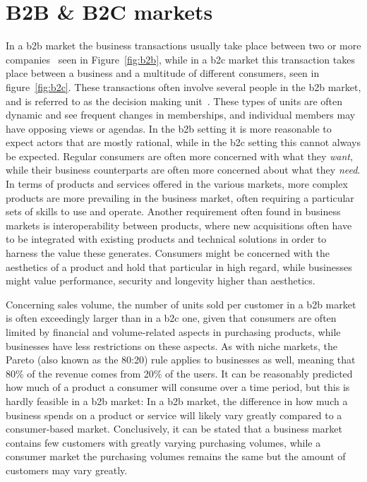 \section{B2B \& B2C markets}
In a \gls{b2b} market the business transactions usually take place between two or more companies~\cite{jewels2001towards} seen in Figure~\ref{fig:b2b}, while in a \gls{b2c} market this transaction takes place between a business and a multitude of different consumers, seen in figure~\ref{fig:b2c}. These transactions often involve several people in the \gls{b2b} market, and is referred to as the decision making unit~\cite{paulhaguenickhaguematthewharrison}. These types of units are often dynamic and see frequent changes in memberships, and individual members may have opposing views or agendas. In the \gls{b2b} setting it is more reasonable to expect actors that are mostly rational, while in the \gls{b2c} setting this cannot always be expected. Regular consumers are often more concerned with what they \textit{want}, while their business counterparts are often more concerned about what they \textit{need}. In terms of products and services offered in the various markets, more complex products are more prevailing in the business market, often requiring a particular sets of skills to use and operate. Another requirement often found in business markets is interoperability between products, where new acquisitions often have to be integrated with existing products and technical solutions in order to harness the value these generates. Consumers might be concerned with the aesthetics of a product and hold that particular in high regard, while businesses might value performance, security and longevity higher than aesthetics. 


Concerning sales volume, the number of units sold per customer in a \gls{b2b} market is often exceedingly larger than in a \gls{b2c} one, given that consumers are often limited by financial and volume-related aspects in purchasing products, while businesses have less restrictions on these aspects. As with niche markets, the Pareto (also known as the 80:20) rule applies to businesses as well, meaning that 80\% of the revenue comes from 20\% of the users. It can be reasonably predicted how much of a product a consumer will consume over a time period, but this is hardly feasible in a \gls{b2b} market: In a \gls{b2b} market, the difference in how much a business spends on a product or service will likely vary greatly compared to a consumer-based market. Conclusively, it can be stated that a business market contains few customers with greatly varying purchasing volumes, while a consumer market the purchasing volumes remains the same but the amount of customers may vary greatly.

